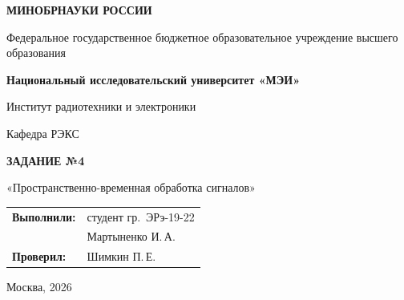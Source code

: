 \begin{titlepage}
    \centering
    {\bfseries МИНОБРНАУКИ РОССИИ\par}
    Федеральное государственное бюджетное образовательное учреждение высшего образования \\
    {\bfseries Национальный исследовательский университет «МЭИ»\par}
    \vspace{1cm}
    Институт радиотехники и электроники\par
    Кафедра РЭКС\par
    \vspace{3cm}
    
    {\bfseries\large ЗАДАНИЕ №4\par}
    \vspace{0.5cm}
    {\large «Пространственно-временная обработка сигналов»\par}
    
    \vspace{3.5cm}
 \vspace{1.5cm}
\noindent\hfill
\begin{tabular}{@{}ll@{}}
    \textbf{Выполнили:} & студент гр.~ЭРэ-19-22 \\
                        & Мартыненко И.\,А. \\
    \textbf{Проверил:}  & Шимкин П.\,Е.
\end{tabular}   
    \vfill
    {Москва, 2026}
\end{titlepage}
